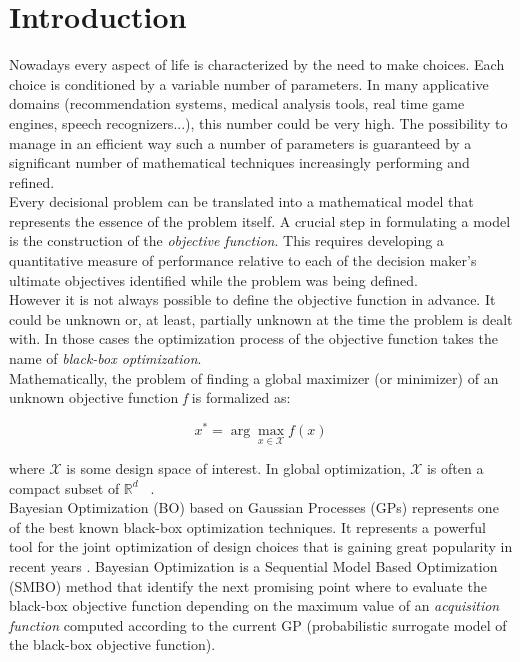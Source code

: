 \chapter{Introduction}

Nowadays every aspect of life is characterized by the need to make choices. Each choice is conditioned by a variable number of parameters. In many applicative domains (recommendation systems, medical analysis tools, real time game engines, speech recognizers...), this number could be very high.  The possibility to manage in an efficient way such a number of parameters is guaranteed by a significant number of mathematical techniques increasingly performing and refined.  \\

Every decisional problem can be translated into a mathematical model that represents the essence of the problem itself. A crucial step in formulating a model is the construction of the \textit{objective function}. This requires developing a quantitative measure of performance relative to each of the decision maker’s ultimate objectives identified while the problem was being defined.~\cite{HillLieb01} \\

However it is not always possible to define the objective function in advance. It could be unknown or, at least, partially unknown at the time the problem is dealt with. In those cases the optimization process of the objective function takes the name of \textit{black-box optimization}. \\

Mathematically, the problem of finding a global maximizer (or minimizer) of an unknown objective function \textit{f} is formalized as:

\begin{equation}
x^* = \arg \max_{x \in \mathcal{X}} f(x)
\end{equation}

where $\mathcal{X}$ is some design space of interest. In global optimization, $\mathcal{X}$ is often a compact subset of $\mathbb{R}^d$ ~\cite{DBLP:journals/pieee/ShahriariSWAF16}. \\

Bayesian Optimization (BO) based on Gaussian Processes (GPs) represents one of the best known black-box optimization techniques. It represents a powerful tool for the joint optimization of design choices that is gaining great popularity in recent years \cite{Adams2008GaussianPP}. Bayesian Optimization is a Sequential Model Based Optimization (SMBO) method that identify the next promising point where to evaluate the black-box objective function depending on the maximum value of an \textit{acquisition function} computed according to the current GP (probabilistic surrogate model of the black-box objective function).\\

